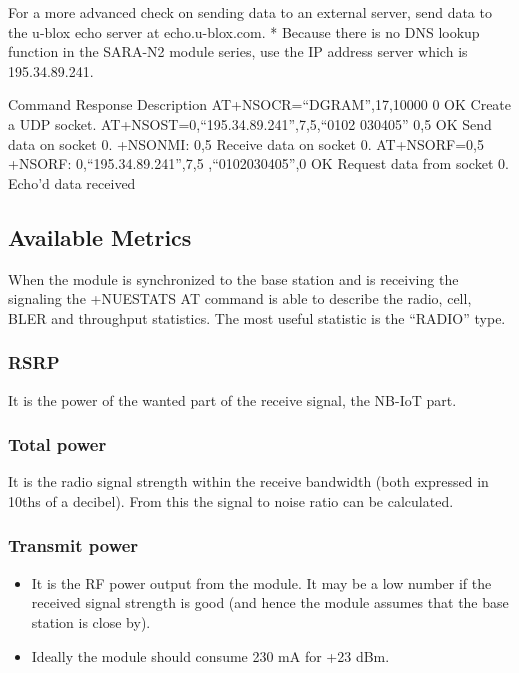 \documentclass[]{article}
\begin{document}
For a more advanced check on sending data to an external server, send
data to the u-blox echo server at echo.u-blox.com. * Because there is no
DNS lookup function in the SARA-N2 module series, use the IP address
server which is 195.34.89.241.

Command Response Description AT+NSOCR=``DGRAM'',17,10000 0 OK Create a
UDP socket. AT+NSOST=0,``195.34.89.241'',7,5,``0102 030405'' 0,5 OK Send
data on socket 0. +NSONMI: 0,5 Receive data on socket 0. AT+NSORF=0,5
+NSORF: 0,``195.34.89.241'',7,5 ,``0102030405'',0 OK Request data from
socket 0. Echo'd data received

\hypertarget{available-metrics}{%
\subsection{Available Metrics}\label{available-metrics}}

When the module is synchronized to the base station and is receiving the
signaling the +NUESTATS AT command is able to describe the radio, cell,
BLER and throughput statistics. The most useful statistic is the
``RADIO'' type.

\hypertarget{rsrp}{%
\subsubsection{RSRP}\label{rsrp}}

It is the power of the wanted part of the receive signal, the NB-IoT
part.

\hypertarget{total-power}{%
\subsubsection{Total power}\label{total-power}}

It is the radio signal strength within the receive bandwidth (both
expressed in 10ths of a decibel). From this the signal to noise ratio
can be calculated.

\hypertarget{transmit-power}{%
\subsubsection{Transmit power}\label{transmit-power}}

\begin{itemize}
\item
  It is the RF power output from the module. It may be a low number if
  the received signal strength is good (and hence the module assumes
  that the base station is close by).
\item
  Ideally the module should consume 230 mA for +23 dBm.
\end{itemize}
\end{document}
